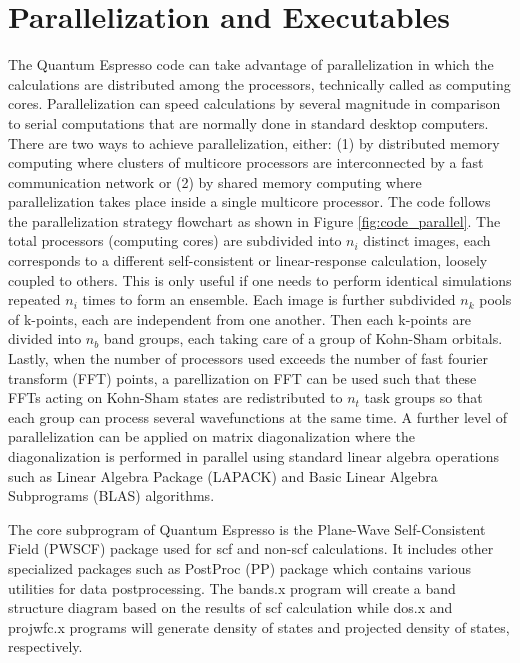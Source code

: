 \section{Parallelization and Executables}
The Quantum Espresso code can take advantage of parallelization in which the calculations are distributed among the processors, technically called as computing cores. Parallelization can speed calculations by several magnitude in comparison to serial computations that are normally done in standard desktop computers. There are two ways to achieve parallelization, either: (1) by distributed memory computing where clusters of multicore processors are interconnected by a fast communication network or (2) by shared memory computing where parallelization takes place inside a single multicore processor. The code follows the parallelization strategy flowchart as shown in  Figure \ref{fig:code_parallel}. The total processors (computing cores) are subdivided into $n_i$ distinct images, each corresponds to a different self-consistent or linear-response calculation, loosely coupled to others. This is only useful if one needs to perform identical simulations repeated $n_i$ times to form an ensemble. Each image is further subdivided $n_k$ pools of k-points, each are independent from one another. Then each k-points are divided into $n_b$ band groups, each taking care of a group of Kohn-Sham orbitals. Lastly, when the number of processors used exceeds the number of fast fourier transform (FFT) points, a parellization  on FFT can be used such that these FFTs acting on Kohn-Sham states are redistributed to $n_t$ task groups so that each group can process several wavefunctions at the same time. A further level of parallelization can be applied on matrix diagonalization where the diagonalization is  performed in parallel using standard linear algebra operations such as Linear Algebra Package (LAPACK) and Basic Linear Algebra Subprograms (BLAS) algorithms.

The core subprogram of Quantum Espresso is the Plane-Wave Self-Consistent Field (PWSCF) package  used for scf and non-scf calculations. It includes other specialized packages such as PostProc (PP) package which contains various utilities for data postprocessing. The  bands.x program will create a band structure diagram based on the results of scf calculation while dos.x and projwfc.x programs will generate density of states and projected density of states, respectively.

